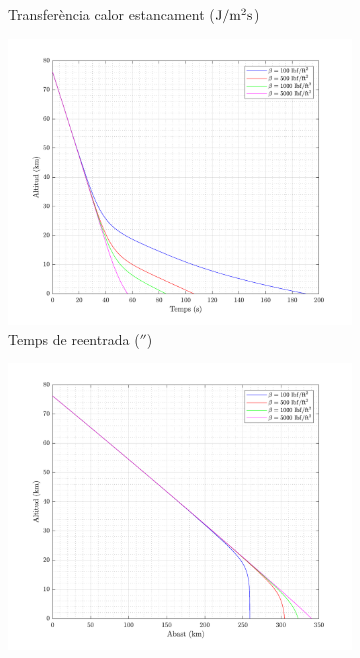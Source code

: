 \begin{figure}[ht]
\begin{subfigure}[t]{.33\textwidth}
        \captionsetup{skip=0pt}
        \caption{Transferència calor estancament ($\joule/\meter^2\second$)}
    \end{subfigure}%
    \begin{subfigure}[t]{.33\textwidth}
        \centering
        \includegraphics[width=\linewidth]{imagenes/01_ballistic_graficas/temps_no_title.pdf}
        \captionsetup{skip=0pt}
        \caption{Temps de reentrada ($\second$)}
    \end{subfigure}
        \begin{subfigure}[t]{.33\textwidth}
        \centering
        \includegraphics[width=\linewidth]{imagenes/01_ballistic_graficas/abast_no_title.pdf}

\end{subfigure}
\end{figure}

